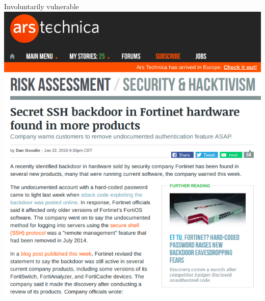 \documentclass[11pt]{beamer}
\begin{document}
\begin{frame}{Involuntarily vulnerable}
\includegraphics[scale=0.28]{fortinet.png}
\end{frame}
\end{document}
